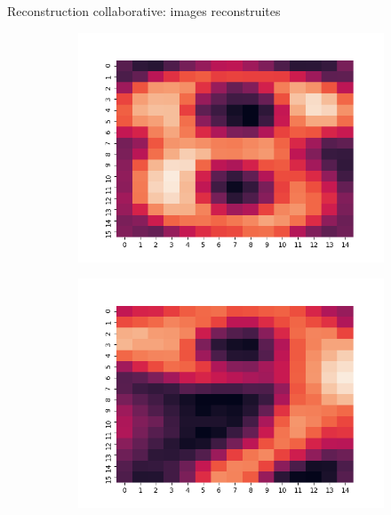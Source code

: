 \documentclass[hyperref={pdfpagelabels=false}]{beamer}
\begin{document}
\begin{frame}{Reconstruction collaborative: images reconstruites}
\begin{figure}[h]
\begin{subfigure}[c]{0.18\textwidth}
                \includegraphics[scale=.12]{8}
            \end{subfigure}
            \begin{subfigure}[c]{0.18\textwidth}
                \includegraphics[scale=.12]{9}
            \end{subfigure}
        \end{figure}
    \end{frame}
\end{document}

